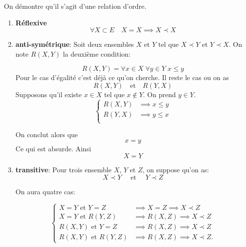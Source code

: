 \documentclass{report}
\begin{document}
\begin{myproof}
 On démontre qu'il s'agit d'une relation d'ordre. 
 \begin{enumerate}
   \item \textbf{Réflexive}
     $$
     \forall X \subset E\quad X = X \implies X \prec X
     $$
 
   \item \textbf{anti-symétrique}: Soit deux ensembles $X$ et $Y$ tel que $X
     \prec Y$ et $Y \prec X$.
     On note $R(X,Y)$ la deuxième condition:

     $$
     R(X,Y) = \forall x \in X\; \forall y \in Y\; x \leq y
     $$
     Pour le cas d'égalité c'est déjà ce qu'on cherche. Il reste le cas ou on as 
     $$
     R(X,Y) \quad \text{et} \quad R(Y,X)
     $$
     Supposons qu'il existe $x \in X$ tel que $x \not\in Y$. On prend $y \in Y$.
     $$
     \begin{cases}
       R(X,Y) &\implies x \leq y\\ 
       R(Y,X) &\implies y \leq x\\
     \end{cases}
     $$

     On conclut alors que 
     $$
     x = y
     $$
     Ce qui est absurde.
     Ainsi 
     $$
     X = Y
     $$
   \item \textbf{transitive}: Pour trois ensemble $X$, $Y$ et $Z$, on
     suppose qu'on as:
     $$
     X \prec Y \quad \text{ et } \quad Y \prec Z
     $$

     On aura quatre cas:
     

     $$
     \begin{cases}
       X=Y \text{ et } Y = Z & \implies X = Z \implies X \prec Z\\
       X=Y \text{ et } R(Y,Z) & \implies R(X,Z) \implies X\prec Z \\
       R(X,Y) \text{ et } Y = Z & \implies R(X,Z) \implies X \prec Z\\
       R(X,Y) \text{ et } R(Y,Z) & \implies R(X, Z) \implies X \prec Z.
     \end{cases}
     $$
 \end{enumerate}
\end{myproof}

\end{document}

